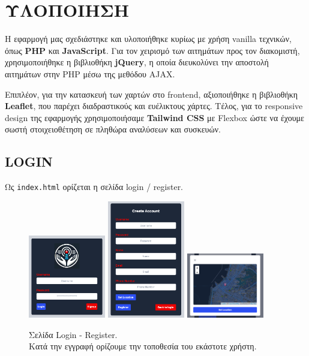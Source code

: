 \chapter{ΥΛΟΠΟΙΗΣΗ}
    Η εφαρμογή μας σχεδιάστηκε και υλοποιήθηκε κυρίως με χρήση vanilla τεχνικών, όπως \textbf{PHP} και \textbf{JavaScript}.
    Για τον χειρισμό των αιτημάτων προς τον διακομιστή, χρησιμοποιήθηκε η βιβλιοθήκη \textbf{jQuery}, η οποία διευκολύνει την αποστολή αιτημάτων στην PHP μέσω της μεθόδου AJAX.

    Επιπλέον, για την κατασκευή των χαρτών στο frontend, αξιοποιήθηκε η βιβλιοθήκη \textbf{Leaflet}, που παρέχει διαδραστικούς και ευέλικτους χάρτες.
    Τέλος, για το responsive design της εφαρμογής χρησιμοποιήσαμε \textbf{Tailwind CSS} με Flexbox ώστε να έχουμε σωστή στοιχειοθέτηση σε πληθώρα αναλύσεων και συσκευών.

\section{LOGIN}
    Ως \texttt{index.html} ορίζεται η σελίδα login / register.

    \begin{figure}[h!] \noindent \centering
        \includegraphics[width=0.3\textwidth]{img/login}
        \includegraphics[width=0.3\textwidth]{img/register}
        \includegraphics[width=0.3\textwidth]{img/register-location}
        \caption{Σελίδα Login - Register. \\Κατά την εγγραφή ορίζουμε την τοποθεσία του εκάστοτε χρήστη.}
    \end{figure}